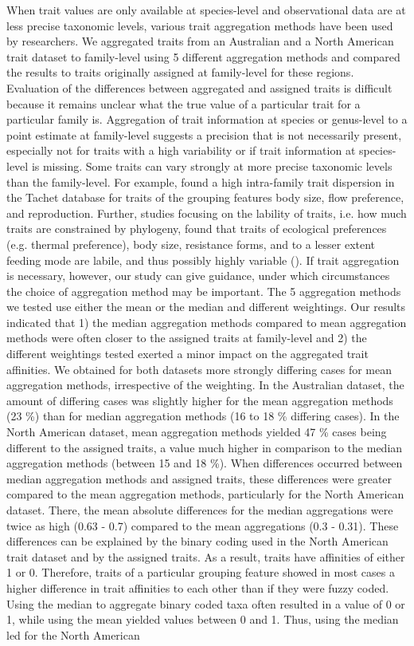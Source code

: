 \documentclass{article}
\begin{document}
When trait values are only available at species-level and observational data are at less precise taxonomic levels, various trait aggregation methods have been used by researchers. We aggregated traits from an Australian and a North American trait dataset to family-level using 5 different aggregation methods and compared the results to traits originally assigned at family-level for these regions. Evaluation of the differences between aggregated and assigned traits is difficult because it remains unclear what the true value of a particular trait for a particular family is. Aggregation of trait information at species or genus-level to a point estimate at family-level suggests a precision that is not necessarily present, especially not for traits with a high variability or if trait information at species-level is missing. Some traits can vary strongly at more precise taxonomic levels than the family-level. For example, \citet{monaghan_improving_2013} found a high intra-family trait dispersion in the Tachet database for traits of the grouping features body size, flow preference, and reproduction. Further, studies focusing on the lability of traits, i.e. how much traits are constrained by phylogeny, found that traits of ecological preferences (e.g. thermal preference), body size, resistance forms, and to a lesser extent feeding mode are labile, and thus possibly highly variable (\cite{poff_functional_2006, wilkes_traitbased_2020}). If trait aggregation is necessary, however, our study can give guidance, under which circumstances the choice of aggregation method may be important. The 5 aggregation methods we tested use either the mean or the median and different weightings. Our results indicated that 1) the median aggregation methods compared to mean aggregation methods were often closer to the assigned traits at family-level and 2) the different weightings tested exerted a minor impact on the aggregated trait affinities. We obtained for both datasets more strongly differing cases for mean aggregation methods, irrespective of the weighting. In the Australian dataset, the amount of differing cases was slightly higher for the mean aggregation methods (23 \%) than for median aggregation methods (16 to 18 \% differing cases). In the North American dataset, mean aggregation methods yielded 47 \% cases being different to the assigned traits, a value much higher in comparison to the median aggregation methods (between 15 and 18 \%). When differences occurred between median aggregation methods and assigned traits, these differences were greater compared to the mean aggregation methods, particularly for the North American dataset. There, the mean absolute differences for the median aggregations were twice as high (0.63 - 0.7) compared to the mean aggregations (0.3 - 0.31). These differences can be explained by the binary coding used in the North American trait dataset and by the assigned traits. As a result, traits have affinities of either 1 or 0. Therefore, traits of a particular grouping feature showed in most cases a higher difference in trait affinities to each other than if they were fuzzy coded. Using the median to aggregate binary coded taxa often resulted in a value of 0 or 1, while using the mean yielded values between 0 and 1. Thus, using the median led for the North American 
\end{document}
